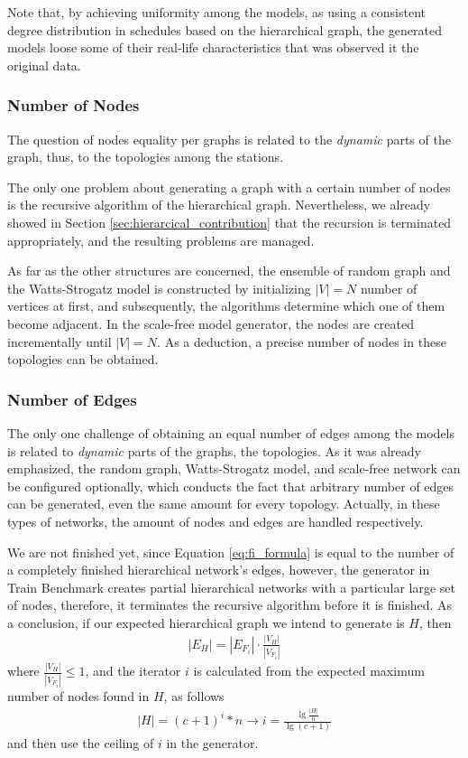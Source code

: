 Note that, by achieving uniformity among the models, as using a consistent degree distribution in schedules based on the hierarchical graph, the generated models loose some of their real-life characteristics that was observed it the original data.

\subsubsection{Number of Nodes}

The question of nodes equality per graphs is related to the \textit{dynamic} parts of the graph, thus, to the topologies among the stations.

The only one problem about generating a graph with a certain number of nodes is the recursive algorithm of the hierarchical graph. Nevertheless, we already showed in Section \ref{sec:hierarcical_contribution} that the recursion is terminated appropriately, and the resulting problems are managed.

As far as the other structures are concerned, the ensemble of random graph and the Watts-Strogatz model is constructed by initializing $|V| = N$ number of vertices at first, and subsequently, the algorithms determine which one of them become adjacent. In the scale-free model generator, the nodes are created incrementally until $|V| = N$. As a deduction, a precise number of nodes in these topologies can be obtained.

\subsubsection{Number of Edges}

The only one challenge of obtaining an equal number of edges among the models is related to \textit{dynamic} parts of the graphs, the topologies. As it was already emphasized, the random graph, Watts-Strogatz model, and scale-free network can be configured optionally, which conducts the fact that arbitrary number of edges can be generated, even the same amount for every topology. Actually, in these types of networks, the amount of nodes and edges are handled respectively.


We are not finished yet, since Equation \ref{eq:fi_formula} is equal to the number of a completely finished hierarchical network's edges, however, the generator in Train Benchmark creates partial hierarchical networks with a particular large set of nodes, therefore, it terminates the recursive algorithm before it is finished. As a conclusion, if our expected hierarchical graph we intend to generate is $H$, then
\begin{align}
	|E_H| = |E_{F_i}| \cdot \frac{|V_H|}{|V_{F_i}|}
\end{align}
where $\frac{|V_H|}{|V_{F_i}|} \leq 1$, and the iterator $i$ is calculated from the expected maximum number of nodes found in $H$, as follows
\begin{align}
	|H| = (c+1)^i * n  \longrightarrow  i = \frac{\lg\frac{|H|}{n}}{\lg(c+1)}
\end{align}
and then use the ceiling of $i$ in the generator.

